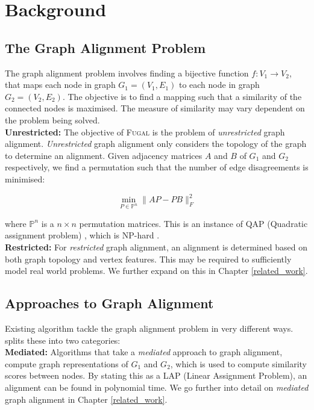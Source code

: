 \section{Background}
\subsection{The Graph Alignment Problem}
The graph alignment problem involves finding a bijective function $f: V_1 \rightarrow V_2$, that maps each node in graph $G_1 = (V_1, E_1)$ to each node in graph $G_2 = (V_2, E_2)$. The objective is to find a mapping such that a similarity of the connected nodes is maximised. The measure of similarity may vary dependent on the problem being solved.\\

\noindent
\textbf{Unrestricted:} The objective of \textsc{Fugal} is the problem of \textit{unrestricted} graph alignment. \textit{Unrestricted} graph alignment only considers the topology of the graph to determine an alignment. Given adjacency matrices $A$ and $B$ of $G_1$ and $G_2$ respectively, we find a permutation such that the number of edge disagreements is minimised:

\begin{equation}\label{original_qap}
\min_{P \in \mathds{P}^n} \lVert AP-PB \rVert^2_F
\end{equation}

where $\mathds{P}^n$ is a $n \times n$ permutation matrices. This is an instance of QAP (Quadratic assignment problem) \citep{fan2020spectral}, which is NP-hard \citep{sahni1972qap}.\\

\noindent
\textbf{Restricted:} For \textit{restricted} graph alignment, an alignment is determined based on both graph topology and vertex features. This may be required to sufficiently model real world problems. We further expand on this in Chapter \ref{related_work}.

\subsection{Approaches to Graph Alignment}
Existing algorithm tackle the graph alignment problem in very different ways. \cite{fugal2024} splits these into two categories:\\

\noindent
\textbf{Mediated:} Algorithms that take a \textit{mediated} approach to graph alignment, compute graph representations of $G_1$ and $G_2$, which is used to compute similarity scores between nodes. By stating this as a LAP (Linear Assignment Problem), an alignment can be found in polynomial time. We go further into detail on \textit{mediated} graph alignment in Chapter \ref{related_work}.\\

